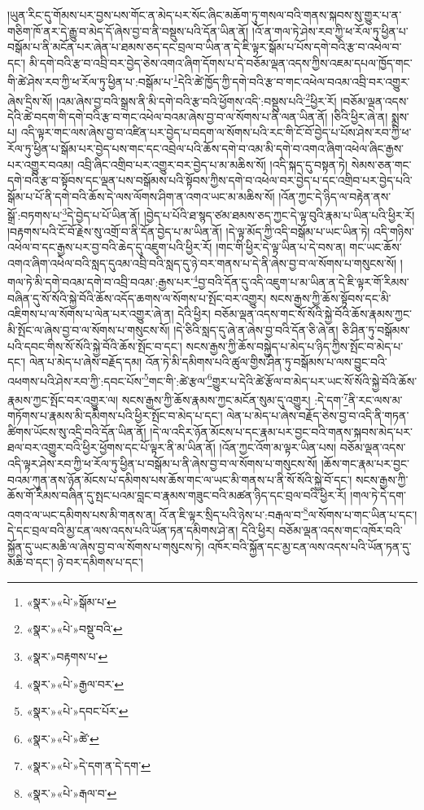།ཡུན་རིང་དུ་གོམས་པར་བྱས་པས་གོང་ན་མེད་པར་སོང་ཞིང་མཆོག་ཏུ་གསལ་བའི་གནས་སྐབས་སུ་གྱུར་པ་ན་གཅིག་ཁོ་ནར་དེ་རྒྱུ་བ་མེད་དོ་ཞེས་བྱ་བ་ནི་བསྡུས་པའི་དོན་ཡིན་ནོ། །འོ་ན་གལ་ཏེ་ཤེས་རབ་ཀྱི་ཕ་རོལ་ཏུ་ཕྱིན་པ་བསྒོམ་པ་ནི་མངོན་པར་ཞེན་པ་ཐམས་ཅད་དང་བྲལ་བ་ཡིན་ན་དེ་ཇི་ལྟར་སྒོམ་པ་པོས་དགེ་བའི་རྩ་བ་འཕེལ་བ་དང་། མི་དགེ་བའི་རྩ་བ་འབྲི་བར་བྱེད་ཅེས་འགའ་ཞིག་དོགས་པ་དེ་བཅོམ་ལྡན་འདས་ཀྱིས་འཇམ་དཔལ་ཁྱོད་གང་གི་ཚེ་ཤེས་རབ་ཀྱི་ཕ་རོལ་ཏུ་ཕྱིན་པ་:བསྒོམ་པ་\footnote{«སྣར་»«པེ་»སྒོམ་པ་}དེའི་ཚེ་ཁྱོད་ཀྱི་དགེ་བའི་རྩ་བ་གང་འཕེལ་བའམ་འབྲི་བར་འགྱུར་ཞེས་དྲིས་སོ། །འམ་ཞེས་བྱ་བའི་སྒྲས་ནི་མི་དགེ་བའི་རྩ་བའི་ཕྱོགས་འདི་:བསྡུས་པའི་\footnote{«སྣར་»«པེ་»བསྡུ་བའི་}ཕྱིར་རོ། །བཅོམ་ལྡན་འདས་དེའི་ཚེ་བདག་གི་དགེ་བའི་རྩ་བ་གང་འཕེལ་བའམ་ཞེས་བྱ་བ་ལ་སོགས་པ་ནི་ལན་ཡིན་ནོ། །ཅིའི་ཕྱིར་ཞེ་ན། སྨྲས་པ། འདི་ལྟར་གང་ལས་ཞེས་བྱ་བ་འཛིན་པར་བྱེད་པ་བདག་ལ་སོགས་པའི་རང་གི་ངོ་བོ་བྱེད་པ་པོས་ཤེས་རབ་ཀྱི་ཕ་རོལ་ཏུ་ཕྱིན་པ་སྒོམ་པར་བྱེད་པས་གང་དང་འབྲེལ་པའི་ཆོས་དགེ་བ་འམ་མི་དགེ་བ་འགའ་ཞིག་འཕེལ་ཞིང་རྒྱས་པར་འགྱུར་བའམ། འབྲི་ཞིང་འགྲིབ་པར་འགྱུར་བར་བྱེད་པ་མ་མཆིས་སོ། །འདི་སྐད་དུ་བསྟན་ཏེ། སེམས་ཅན་གང་དགེ་བའི་རྩ་བ་སྟོབས་དང་ལྡན་པས་བསྒོམས་པའི་སྟོབས་ཀྱིས་དགེ་བ་འཕེལ་བར་བྱེད་པ་དང་འགྲིབ་པར་བྱེད་པའི་སྒོམ་པ་པོ་ནི་དགེ་བའི་ཆོས་དེ་ལས་ལོགས་ཤིག་ན་འགའ་ཡང་མ་མཆིས་སོ། །འོན་ཀྱང་དེ་ཉིད་ལ་བརྟེན་ནས་སྒྲོ་:བཏགས་པ་\footnote{«སྣར་»བརྟགས་པ་}དེ་བྱེད་པ་པོ་ཡིན་ནོ། །བྱེད་པ་པོའི་ཐ་སྙད་ཙམ་ཐམས་ཅད་ཀྱང་དེ་ལྟ་བུའི་རྣམ་པ་ཡིན་པའི་ཕྱིར་རོ། །བརྟགས་པའི་ངོ་བོ་རྗེས་སུ་འགྲོ་བ་ནི་དོན་བྱེད་པ་མ་ཡིན་ནོ། །དེ་ལྟ་མོད་ཀྱི་འདི་བསྒོམ་པ་ཡང་ཡིན་ཏེ། འདི་གཉིས་འཕེལ་བ་དང་རྒྱས་པར་བྱ་བའི་ཆེད་དུ་འཇུག་པའི་ཕྱིར་རོ། །གང་གི་ཕྱིར་དེ་ལྟ་ཡིན་པ་དེ་བས་ན། གང་ཡང་ཆོས་འགའ་ཞིག་འཕེལ་བའི་སླད་དུའམ་འབྲི་བའི་སླད་དུ་ཉེ་བར་གནས་པ་དེ་ནི་ཞེས་བྱ་བ་ལ་སོགས་པ་གསུངས་སོ། །གལ་ཏེ་མི་དགེ་བའམ་དགེ་བ་འབྲི་བའམ་:རྒྱས་པར་\footnote{«སྣར་»«པེ་»རྒྱལ་བར་}བྱ་བའི་དོན་དུ་འདི་འཇུག་པ་མ་ཡིན་ན་དེ་ཇི་ལྟར་གོ་རིམས་བཞིན་དུ་སོ་སོའི་སྐྱེ་བོའི་ཆོས་འདོད་ཆགས་ལ་སོགས་པ་སྤོང་བར་འགྱུར། སངས་རྒྱས་ཀྱི་ཆོས་སྟོབས་དང་མི་འཇིགས་པ་ལ་སོགས་པ་ལེན་པར་འགྱུར་ཞེ་ན། དེའི་ཕྱིར། བཅོམ་ལྡན་འདས་གང་སོ་སོའི་སྐྱེ་བོའི་ཆོས་རྣམས་ཀྱང་མི་སྤོང་ལ་ཞེས་བྱ་བ་ལ་སོགས་པ་གསུངས་སོ། །དེ་ཅིའི་སླད་དུ་ཞེ་ན་ཞེས་བྱ་བའི་དོན་ཅི་ཞེ་ན། ཅི་ཤིན་ཏུ་བསྒོམས་པའི་དབང་གིས་སོ་སོའི་སྐྱེ་བོའི་ཆོས་སྤོང་བ་དང་། སངས་རྒྱས་ཀྱི་ཆོས་བསྐྱེད་པ་མེད་པ་ཉིད་ཀྱིས་སྤོང་བ་མེད་པ་དང་། ལེན་པ་མེད་པ་ཞེས་བརྗོད་དམ། འོན་ཏེ་མི་དམིགས་པའི་ཚུལ་གྱིས་ཤིན་ཏུ་བསྒོམས་པ་ལས་བྱུང་བའི་འཕགས་པའི་ཤེས་རབ་ཀྱི་:དབང་པོས་\footnote{«སྣར་»«པེ་»དབང་པོར་}གང་གི་:ཚེ་རྩལ་\footnote{«སྣར་»«པེ་»ཚེ་}གྱུར་པ་དེའི་ཚེ་རྩོལ་བ་མེད་པར་ཡང་སོ་སོའི་སྐྱེ་བོའི་ཆོས་རྣམས་ཀྱང་སྤོང་བར་འགྱུར་ལ། སངས་རྒྱས་ཀྱི་ཆོས་རྣམས་ཀྱང་མངོན་སུམ་དུ་འགྱུར། :དེ་དག་\footnote{«སྣར་»«པེ་»དེ་དག་ན་དེ་དག་}ནི་རང་ལས་མ་གཏོགས་པ་རྣམས་མི་དམིགས་པའི་ཕྱིར་སྤོང་བ་མེད་པ་དང་། ལེན་པ་མེད་པ་ཞེས་བརྗོད་ཅེས་བྱ་བ་འདི་ནི་གཏན་ཚིགས་ཡོངས་སུ་འདྲི་བའི་དོན་ཡིན་ནོ། །དེ་ལ་འདིར་ཉོན་མོངས་པ་དང་རྣམ་པར་བྱང་བའི་གནས་སྐབས་མེད་པར་ཐལ་བར་འགྱུར་བའི་ཕྱིར་ཕྱོགས་དང་པོ་ལྟར་ནི་མ་ཡིན་ནོ། །འོན་ཀྱང་འོག་མ་ལྟར་ཡིན་པས། བཅོམ་ལྡན་འདས་འདི་ལྟར་ཤེས་རབ་ཀྱི་ཕ་རོལ་ཏུ་ཕྱིན་པ་བསྒོམ་པ་ནི་ཞེས་བྱ་བ་ལ་སོགས་པ་གསུངས་སོ། །ཆོས་གང་རྣམ་པར་བྱང་བའམ་ཀུན་ནས་ཉོན་མོངས་པ་དམིགས་པས་ཆོས་གང་ལ་ཡང་མི་གནས་པ་ནི་སོ་སོའི་སྐྱེ་བོ་དང་། སངས་རྒྱས་ཀྱི་ཆོས་གོ་རིམས་བཞིན་དུ་སྤང་པའམ་བླང་བ་རྣམས་གཟུང་བའི་མཚན་ཉིད་དང་བྲལ་བའི་ཕྱིར་རོ། །གལ་ཏེ་དེ་དག་འགའ་ལ་ཡང་དམིགས་པས་མི་གནས་ན། འོ་ན་ཇི་ལྟར་སྲིད་པའི་ཉེས་པ་:བརྒལ་བ་\footnote{«སྣར་»«པེ་»རྒལ་བ་}ལ་སོགས་པ་གང་ཡིན་པ་དང་། དེ་དང་བྲལ་བའི་མྱ་ངན་ལས་འདས་པའི་ཡོན་ཏན་དམིགས་ཤེ་ན། དེའི་ཕྱིར། བཅོམ་ལྡན་འདས་གང་འཁོར་བའི་སྐྱོན་དུ་ཡང་མཆི་ལ་ཞེས་བྱ་བ་ལ་སོགས་པ་གསུངས་ཏེ། འཁོར་བའི་སྐྱོན་དང་མྱ་ངན་ལས་འདས་པའི་ཡོན་ཏན་དུ་མཆི་བ་དང་། ཉེ་བར་དམིགས་པ་དང་། 
